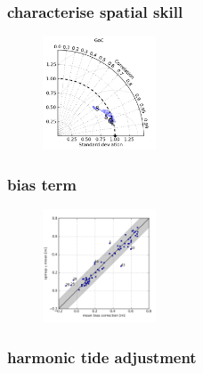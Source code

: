 \begin{frame}
\frametitle{characterise spatial skill}
    \begin{figure}      
    \includegraphics[width=0.3\textwidth]{figures/plots/taylor_diag_res_GoC.png}
    \end{figure}
\end{frame}
\begin{frame}
\frametitle{bias term}
\begin{figure}      
    \includegraphics[width=0.3\textwidth]{figures/plots/aggSL_bias_breakdown_plot_1.png}
    \end{figure}
\end{frame}
\begin{frame}
\frametitle{harmonic tide adjustment}
\end{frame}
